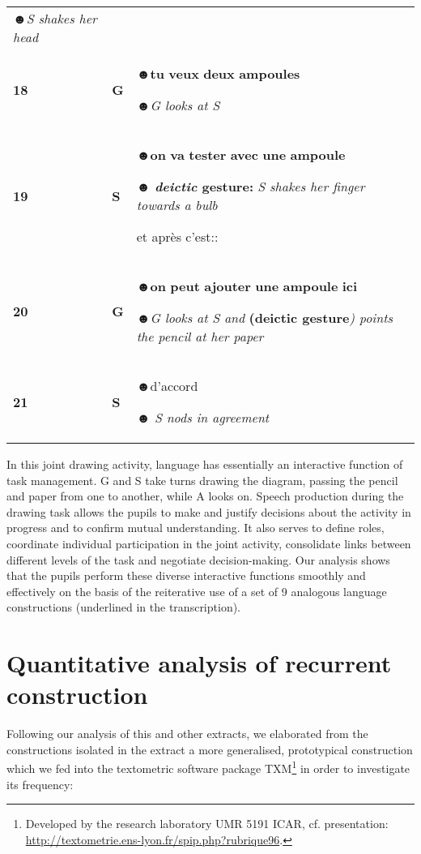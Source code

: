 \documentclass[output=paper]{langscibook}
\begin{document}
\begin{longtable}{llp{}}
☻\textit{S shakes her head}\\
{\bfseries \textmd{18}} & {\bfseries \textmd{G}} & ☻\textbf{tu} \textbf{veux} \textbf{deux} \textbf{ampoules} 

☻\textit{G looks at S}\\
{\bfseries \textmd{19}} & {\bfseries \textmd{S}} & ☻\textbf{on} \textbf{va} \textbf{tester} \textbf{avec} \textbf{une} \textbf{ampoule} 

☻ \textbf{\textit{deictic} \textbf{gesture:}} \textit{S shakes her finger towards a bulb}

 et après c’est::\\
{\bfseries \textmd{20}} & {\bfseries \textmd{G}} & ☻\textbf{on} \textbf{peut} \textbf{ajouter} \textbf{une} \textbf{ampoule} \textbf{ici}

☻\textit{G looks at S and}\textbf{ \textbf{(deictic} \textbf{gesture}}\textit{) points the pencil at her paper}\\
{\bfseries \textmd{21}} & {\bfseries \textmd{S}} & ☻d’accord  

☻ \textit{S nods in agreement}\\
\end{longtable}

In this joint drawing activity, language has essentially an interactive function of task management. G and S take turns drawing the diagram, passing the pencil and paper from one to another, while A looks on. Speech production during the drawing task allows the pupils to make and justify decisions about the activity in progress and to confirm mutual understanding. It also serves to define roles, coordinate individual participation in the joint activity, consolidate links between different levels of the task and negotiate decision-making. Our analysis shows that the pupils perform these diverse interactive functions smoothly and effectively on the basis of the reiterative use of a set of 9 analogous language constructions (underlined in the transcription).

\section{Quantitative analysis of recurrent construction} %

Following our analysis of this and other extracts, we elaborated from the constructions isolated in the extract a more generalised, prototypical construction which we fed into the textometric software package TXM\footnote{Developed by the research laboratory UMR 5191 ICAR, cf. presentation: \url{http://textometrie.ens-lyon.fr/spip.php?rubrique96}.} in order to investigate its frequency:
\end{document}

